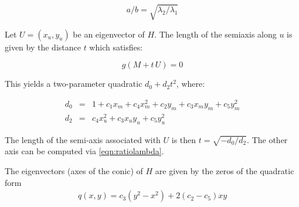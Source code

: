 \begin{equation}
a/b=\sqrt{\lambda_2/\lambda_1}
\label{eqn:ratiolambda}
\end{equation}

Let $U=(x_u,y_u)$ be an eigenvector of $H$. The length of the semiaxis along $u$ is given by the distance $t$ which satisfies:

$$
g(M + t\,U) = 0
$$

This yields a two-parameter quadratic $d_0 + d_2 t^2$, where:

$$
\begin{array}{cll}
d_0 & = & 1 + c_1 x_m + c_4 x_m^2 + c_2 y_m + c_3 x_m y_m + c_5 y_m^2 \\ 
d_2 & = & c_4 x_u^2 + c_3 x_u y_u + c_5 y_u^2
\end{array}
$$

The length of the semi-axis associated with $U$ is then $t=\sqrt{-d_0/d_2}$. The other axis can be computed via \eqref{eqn:ratiolambda}.

The eigenvectors (axes of the conic) of $H$ are given by the  zeros of the quadratic form
\begin{align*}
   q(x,y)= c_3(y^2-x^2)+2(c_2-c_5)xy
\end{align*}

